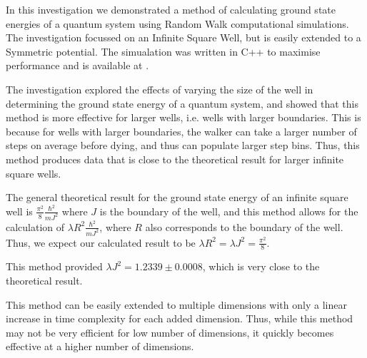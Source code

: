 \documentclass[journal]{IEEEtran}
\begin{document}
In this investigation we demonstrated a method of calculating ground state
energies of a quantum system using Random Walk computational simulations. The
investigation focussed on an Infinite Square Well, but is easily extended to a
Symmetric potential. The simualation was written in C++ to maximise performance
and is available at .

The investigation explored the effects of varying the size of the well in
determining the ground state energy of a quantum system, and showed that this
method is more effective for larger wells, i.e. wells with larger
boundaries. This is because for wells with larger boundaries, the walker can
take a larger number of steps on average before dying, and thus can populate
larger step bins. Thus, this method produces data that is close to the
theoretical result for larger infinite square wells.

The general theoretical result for the ground state energy of an infinite square
well is $\frac{\pi^2}{8}\frac{\hbar^2}{mJ^2}$ where $J$ is the boundary of the
well, and this method allows for the calculation of $\lambda R^2
\frac{\hbar^2}{mJ^2}$, where $R$ also corresponds to the boundary of the
well. Thus, we expect our calculated result to be $\lambda R^2 = \lambda J^2 =
\frac{\pi^2}{8}$.

This method provided $\lambda J^2 = 1.2339 \pm 0.0008$, which is very close to
the theoretical result.

This method can be easily extended to multiple dimensions with only a linear
increase in time complexity for each added dimension. Thus, while this method
may not be very efficient for low number of dimensions, it quickly becomes
effective at a higher number of dimensions.




%
\end{document}
